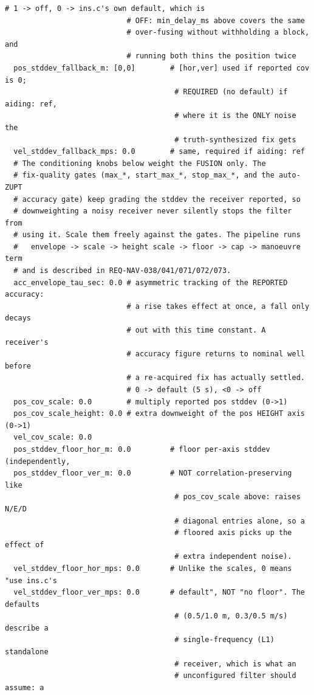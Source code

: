 \documentclass[11pt,a4paper]{article}
\begin{document}
\begin{lstlisting}[style=cfg]
                            # 1 -> off, 0 -> ins.c's own default, which is
                            # OFF: min_delay_ms above covers the same
                            # over-fusing without withholding a block, and
                            # running both thins the position twice
  pos_stddev_fallback_m: [0,0]        # [hor,ver] used if reported cov is 0;
                                       # REQUIRED (no default) if aiding: ref,
                                       # where it is the ONLY noise the
                                       # truth-synthesized fix gets
  vel_stddev_fallback_mps: 0.0        # same, required if aiding: ref
  # The conditioning knobs below weight the FUSION only. The
  # fix-quality gates (max_*, start_max_*, stop_max_*, and the auto-ZUPT
  # accuracy gate) keep grading the stddev the receiver reported, so
  # downweighting a noisy receiver never silently stops the filter from
  # using it. Scale them freely against the gates. The pipeline runs
  #   envelope -> scale -> height scale -> floor -> cap -> manoeuvre term
  # and is described in REQ-NAV-038/041/071/072/073.
  acc_envelope_tau_sec: 0.0 # asymmetric tracking of the REPORTED accuracy:
                            # a rise takes effect at once, a fall only decays
                            # out with this time constant. A receiver's
                            # accuracy figure returns to nominal well before
                            # a re-acquired fix has actually settled.
                            # 0 -> default (5 s), <0 -> off
  pos_cov_scale: 0.0        # multiply reported pos stddev (0->1)
  pos_cov_scale_height: 0.0 # extra downweight of the pos HEIGHT axis (0->1)
  vel_cov_scale: 0.0
  pos_stddev_floor_hor_m: 0.0         # floor per-axis stddev (independently,
  pos_stddev_floor_ver_m: 0.0         # NOT correlation-preserving like
                                       # pos_cov_scale above: raises N/E/D
                                       # diagonal entries alone, so a
                                       # floored axis picks up the effect of
                                       # extra independent noise).
  vel_stddev_floor_hor_mps: 0.0       # Unlike the scales, 0 means "use ins.c's
  vel_stddev_floor_ver_mps: 0.0       # default", NOT "no floor". The defaults
                                       # (0.5/1.0 m, 0.3/0.5 m/s) describe a
                                       # single-frequency (L1) standalone
                                       # receiver, which is what an
                                       # unconfigured filter should assume: a

\end{lstlisting}
\end{document}
